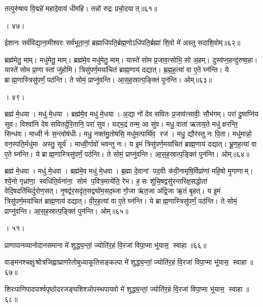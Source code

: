 तत्पुरु॑षाय वि॒द्महे॑ महादे॒वाय॑ धीमहि। तन्नो॑ रुद्रः प्रचो॒दयात्॥६१॥

। ४७।
\anuvakamend


ईशानः सर्व॑विद्या॒ना॒मीश्वरः सर्व॑भूता॒नां॒ ब्रह्माधि॑पति॒र्ब्रह्म॒णोऽधि॑पति॒र्ब्रह्मा॑ शि॒वो मे॑ अस्तु सदाशि॒वोम्॥६२॥


ब्रह्म॑मेतु॒ माम्। मधु॑मेतु॒ माम्। ब्रह्म॑मे॒व मधु॑मेतु॒ माम्। यास्ते॑ सोम प्र॒जाव॒त्सोभि॒ सो अ॒हम्। दुस्व॑प्न॒हन्दु॑रुष्व॒हा। यास्ते॑ सोम प्रा॒णास्तां जु॑होमि। त्रिसु॑पर्ण॒मया॑चितं ब्राह्म॒णाय॑ दद्यात्। ब्र॒ह्म॒ह॒त्यां वा ए॒ते घ्न॑न्ति। ये ब्राह्म॒णास्त्रिसु॑पर्णं॒ पठ॑न्ति। ते सोमं॒ प्राप्नु॑वन्ति। आ॒स॒ह॒स्रात्प॒ङ्क्तिं पुन॑न्ति। ओम्॥६३॥

। ४९।
\anuvakamend


ब्रह्म॑ मे॒धया। मधु॑ मे॒धया। ब्रह्म॑मे॒व मधु॑ मे॒धया। अ॒द्या नो॑ देव सवितः प्र॒जाव॑त्सावीः॒ सौभ॑गम्। परा॑ दु॒ष्वप्नि॑य सुव। विश्वा॑नि देव सवितर्दुरि॒तानि॒ परा॑ सुव। यद्भ॒द्रं तन्म॒ आ सु॑व। मधु॒ वाता॑ ऋताय॒ते मधु॑ क्षरन्ति॒ सिन्ध॑वः। माध्वीर्नः स॒न्त्वोष॑धीः। मधु॒ नक्त॑मु॒तोषसि॒ मधु॑म॒त्पार्थि॑व॒ रज॑। मधु॒ द्यौर॑स्तु नः पि॒ता। मधु॑मान्नो॒ वन॒स्पति॒र्मधु॑मा अस्तु॒ सूर्य॑। माध्वी॒र्गावो॑ भवन्तु नः। य इ॒मं त्रिसु॑पर्ण॒मया॑चितं ब्राह्म॒णाय॑ दद्यात्। भ्रू॒ण॒ह॒त्यां वा ए॒ते घ्न॑न्ति। ये ब्राह्म॒णास्त्रिसु॑पर्णं॒ पठ॑न्ति। ते सोमं॒ प्राप्नु॑वन्ति। आ॒स॒ह॒स्रात्प॒ङ्क्तिं पुन॑न्ति। ओम्॥६४॥
\anuvakamend


ब्रह्म॑ मे॒धवा। मधु॑ मे॒धवा। ब्रह्म॑मे॒व मधु॑ मे॒धवा। ब्र॒ह्मा दे॒वानां पद॒वीः क॑वी॒नामृषि॒र्विप्रा॑णां महि॒षो मृ॒गाणाम्। श्ये॒नो गृध्रा॑णा॒ स्वधि॑ति॒र्वना॑ना॒ सोम॑ प॒वित्र॒मत्ये॑ति॒ रेभ\sn{}। ह॒सः  शु॑चि॒षद्वसु॑रन्तरिक्ष॒सद्धोता॑ वेदि॒षदति॑थिर्दुरोण॒सत्। नृ॒षद्व॑र॒सदृ॑त॒सद्व्यो॑म॒सद॒ब्जा गो॒जा ऋ॑त॒जा अ॑द्रि॒जा ऋ॒तं बृ॒हत्। य इ॒मं त्रिसु॑पर्ण॒मया॑चितं ब्राह्म॒णाय॑ दद्यात्। वी॒र॒ह॒त्यां वा ए॒ते घ्न॑न्ति। ये ब्राह्म॒णास्त्रिसु॑पर्णं॒ पठ॑न्ति। ते सोमं॒ प्राप्नु॑वन्ति। आ॒स॒ह॒स्रात्प॒ङ्क्तिं पुन॑न्ति। ओम्॥६५॥

। ५१।
\anuvakamend


प्राणापानव्यानोदानसमाना मे॑ शुद्ध्य॒न्तां॒ ज्योति॑र॒हं  वि॒रजा॑ विपा॒प्मा भू॑यास॒ स्वाहा॥६६॥
\anuvakamend


वाङ्मनश्चक्षुःश्रोत्रजिह्वाघ्राणरेतोबुध्याकूतिसङ्कल्पा मे॑ शुद्ध्य॒न्तां॒ ज्योति॑र॒हं  वि॒रजा॑ विपा॒प्मा भू॑यास॒ स्वाहा॥६७॥
\anuvakamend


शिरःपाणिपादपार्श्वपृष्ठोदरजङ्घशिश्ञोपस्थपायवो मे॑ शुद्ध्य॒न्तां॒ ज्योति॑र॒हं  वि॒रजा॑ विपा॒प्मा भू॑यास॒ स्वाहा॥६८॥
\anuvakamend


